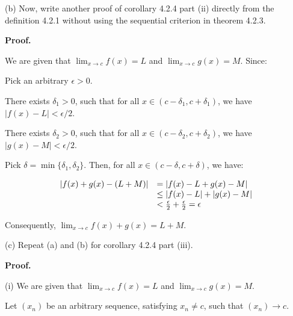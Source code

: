 \documentclass[10pt]{article}
\begin{document}
(b) Now, write another proof of corollary 4.2.4 part (ii) directly from the definition 4.2.1 without using the sequential criterion in theorem 4.2.3.



\textbf{Proof.}



We are given that $\displaystyle \lim _{x\rightarrow c} f( x) =L$ and $\displaystyle \lim _{x\rightarrow c} g( x) =M$. Since:



Pick an arbitrary $\displaystyle \epsilon  >0$. 



There exists $\displaystyle \delta _{1}  >0$, such that for all $\displaystyle x\in ( c-\delta _{1} ,c+\delta _{1})$, we have $\displaystyle | f( x) -L|< \epsilon /2$.



There exists $\displaystyle \delta _{2}  >0$, such that for all $ $$\displaystyle x\in ( c-\delta _{2} ,c+\delta _{2})$, we have $\displaystyle |g( x) -M|< \epsilon /2$.



Pick $\displaystyle \delta =\min\{\delta _{1} ,\delta _{2}\}$. Then, for all $\displaystyle x\in ( c-\delta ,c+\delta )$, we have:


\begin{equation*}
\begin{array}{ c l }
| f( x) +g( x) -( L+M)|  & =| f( x) -L+g( x) -M| \\
 & \leq |f( x) -L|+|g( x) -M|\\
 & < \frac{\epsilon }{2} +\frac{\epsilon }{2} =\epsilon 
\end{array}
\end{equation*}
 

Consequently, $\displaystyle \lim _{x\rightarrow c} f( x) +g( x) =L+M$.



(c) Repeat (a) and (b) for corollary 4.2.4 part (iii).



\textbf{Proof.}



(i) We are given that $\displaystyle \lim _{x\rightarrow c} f( x) =L$ and $\displaystyle \lim _{x\rightarrow c} g( x) =M$.



Let $\displaystyle ( x_{n})$ be an arbitrary sequence, satisfying $\displaystyle x_{n} \neq c$, such that $\displaystyle ( x_{n})\rightarrow c$. 
\end{document}
